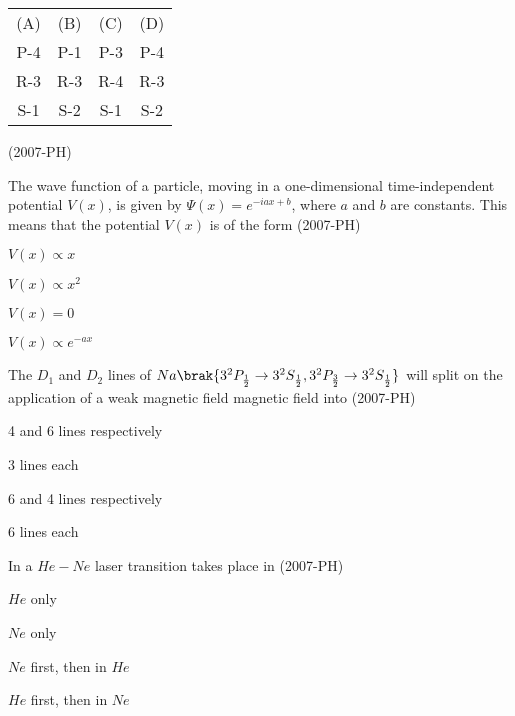     \begin{table}[H]
        \centering
       \begin{tabular}{c c c c }
   (A)  & (B) & (C) & (D)  \\
     P-4 & P-1 & P-3 & P-4 \\
     R-3 & R-3 & R-4 & R-3 \\
     S-1 & S-2 & S-1 & S-2
\end{tabular}

    \end{table} 

    \hfill (2007-PH)
    \item The wave function of a particle, moving in a one-dimensional time-independent potential  $V(x)$, is given by $\Psi(x) = e^{-iax + b}$, where $a$ and $b$ are constants. This means that the potential $V(x)$ is of the form \hfill (2007-PH)
    \begin{enumerate}
        \begin{multicols}{2}
            \item $V(x) \propto x$
            \item $V(x) \propto x^2$
            \item $V(x) = 0 $
            \item $V(x) \propto e^{-ax}$
        \end{multicols}
    \end{enumerate}
    \item The $D_1$ and $D_2$ lines of $Na\brak{3^2P_{\frac{1}{2}} \to 3^2S_{\frac{1}{2}}, 3^2P_{\frac{3}{2}} \to 3^2S_{\frac{1}{2}}}$ will split on the application of a weak magnetic field magnetic field into \hfill (2007-PH)
    \begin{enumerate}
        \begin{multicols}{2}
            \item 4 and 6 lines respectively
            \item 3 lines each 
            \item 6 and 4 lines respectively
            \item 6 lines each
        \end{multicols}
    \end{enumerate}
    \item In a $He-Ne$ laser transition takes place in \hfill (2007-PH)
    \begin{enumerate}
        \begin{multicols}{2}
            \item $He$ only
            \item $Ne$ only
            \item $Ne$ first, then in $He$
            \item $He$ first, then in $Ne$
        \end{multicols}
    \end{enumerate}
